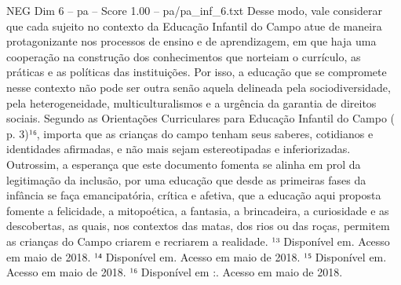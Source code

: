 \begin{textsample}{NEG Dim 6 – pa – Score 1.00 – pa/pa\_inf\_6.txt}
Desse modo, vale considerar que cada sujeito no contexto da Educação Infantil do Campo atue de maneira protagonizante nos processos de ensino e de aprendizagem, em que haja uma cooperação na construção dos conhecimentos que norteiam o currículo, as práticas e as políticas das instituições.
Por isso, a educação que se compromete nesse contexto não pode ser outra senão aquela delineada pela sociodiversidade, pela heterogeneidade, multiculturalismos e a urgência da garantia de direitos sociais.
Segundo as Orientações Curriculares para Educação Infantil do Campo ( p. 3)¹⁶, importa que as crianças do campo tenham seus saberes, cotidianos e identidades afirmadas, e não mais sejam estereotipadas e inferiorizadas.
Outrossim, a esperança que este documento fomenta se alinha em prol da legitimação da inclusão, por uma educação que desde as primeiras fases da infância se faça emancipatória, crítica e afetiva, que a educação aqui proposta fomente a felicidade, a mitopoética, a fantasia, a brincadeira, a curiosidade e as descobertas, as quais, nos contextos das matas, dos rios ou das roças, permitem as crianças do Campo criarem e recriarem a realidade. ¹³ Disponível em.
Acesso em maio de 2018. ¹⁴ Disponível em.
Acesso em maio de 2018. ¹⁵ Disponível em.
Acesso em maio de 2018. ¹⁶ Disponível em :.
Acesso em maio de 2018.

\end{textsample}
